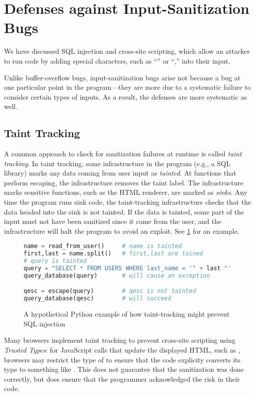 \section{Defenses against Input-Sanitization Bugs}
We have discussed SQL injection and cross-site scripting, which allow an attacker to run code by adding special characters, such as ``'' or ``\ttt{>},'' into their input.

Unlike buffer-overflow bugs, input-sanitization bugs arise not because a bug at one
particular point in the program---they are more due to a systematic failure to 
consider certain types of inputs.
As a result, the defenses are more systematic as well.

\subsection{Taint Tracking}
A common approach to check for sanitization failures at runtime
is called \emph{taint tracking}.
In taint tracking, some infrastructure in the program (e.g., a SQL library) marks any data
coming from user input as \emph{tainted}.
At functions that perform escaping, the infrastructure removes the taint label.
The infrastructure marks sensitive functions, such as the HTML renderer, are marked as \emph{sinks}. 
Any time the program runs sink code, the taint-tracking infrastructure checks
that the data headed into the sink is not tainted.
If the data is tainted, some part of the input must not have been sanitized since it came from the user, and the infrastructure will halt the program to avoid an exploit.
See \cref{fig:taint} for an example.

\begin{figure}
\begin{lstlisting}[language=python]
name = read_from_user()     # name is tainted
first,last = name.split()   # first,last are tained
# query is tainted
query = "SELECT * FROM USERS WHERE last_name = '" + last "'"
query_database(query)       # will cause an exception

qesc = escape(query)        # qesc is not tainted
query_database(qesc)        # will succeed
\end{lstlisting}
  \caption{A hypothetical Python example of how taint-tracking might prevent
SQL injection}\label{fig:taint}
\end{figure}

Many browsers implement taint tracking to prevent cross-site scripting using \emph{Trusted Types}: for JavaScript calls that update the displayed HTML, such as , browsers may restrict the type of  to ensure that the code explicity converts its type to something like . This does not guarantee that the sanitization was done correctly, but does ensure that the programmer acknowledged the risk in their code.
